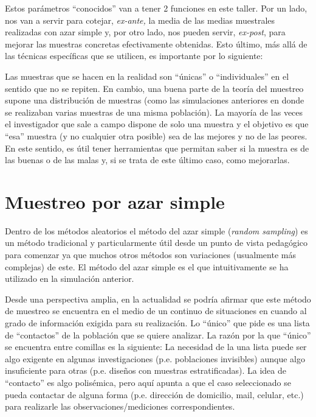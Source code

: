 \documentclass[
  spanish,
  a4paper,
]{scrreprt}
\begin{document}
\begin{table}
{}

\end{table}%

Estos parámetros ``conocidos'' van a tener 2 funciones en este taller.
Por un lado, nos van a servir para cotejar, \emph{ex-ante,} la media de
las medias muestrales realizadas con azar simple y, por otro lado, nos
pueden servir, \emph{ex-post}, para mejorar las muestras concretas
efectivamente obtenidas. Esto último, más allá de las técnicas
específicas que se utilicen, es importante por lo siguiente:

Las muestras que se hacen en la realidad son ``únicas'' o
``individuales'' en el sentido que no se repiten. En cambio, una buena
parte de la teoría del muestreo supone una distribución de muestras
(como las simulaciones anteriores en donde se realizaban varias muestras
de una misma población). La mayoría de las veces el investigador que
sale a campo dispone de solo una muestra y el objetivo es que ``esa''
muestra (y no cualquier otra posible) sea de las mejores y no de las
peores. En este sentido, es útil tener herramientas que permitan saber
si la muestra es de las buenas o de las malas y, si se trata de este
último caso, como mejorarlas.

\section{Muestreo por azar simple}\label{sec-azar_simple}

Dentro de los métodos aleatorios el método del azar simple (\emph{random
sampling}) es un método tradicional y particularmente útil desde un
punto de vista pedagógico para comenzar ya que muchos otros métodos son
variaciones (usualmente más complejas) de este. El método del azar
simple es el que intuitivamente se ha utilizado en la simulación
anterior.

Desde una perspectiva amplia, en la actualidad se podría afirmar que
este método de muestreo se encuentra en el medio de un continuo de
situaciones en cuando al grado de información exigida para su
realización. Lo ``único'' que pide es una lista de ``contactos'' de la
población que se quiere analizar. La razón por la que ``único'' se
encuentra entre comillas es la siguiente: La necesidad de la una lista
puede ser algo exigente en algunas investigaciones (p.e. poblaciones
invisibles) aunque algo insuficiente para otras (p.e. diseños con
muestras estratificadas). La idea de ``contacto'' es algo polisémica,
pero aquí apunta a que el caso seleccionado se pueda contactar de alguna
forma (p.e. dirección de domicilio, mail, celular, etc.) para realizarle
las observaciones/mediciones correspondientes.
\end{document}
